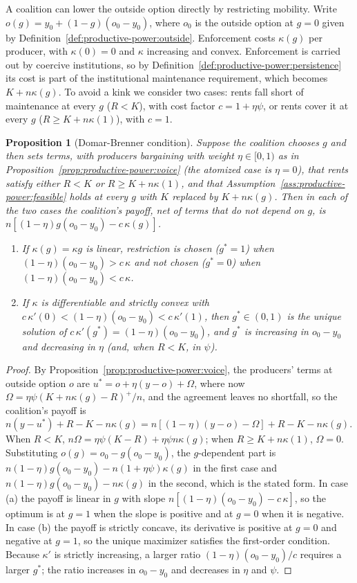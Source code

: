 \documentclass[11pt,letterpaper]{article}
\newtheorem{proposition}[theorem]{Proposition}
\theoremstyle{definition}
\theoremstyle{remark}
\begin{document}
A coalition can lower the outside option directly by restricting mobility. Write $o(g)=y_0+(1-g)(o_0-y_0)$, where $o_0$ is the outside option at $g=0$ given by Definition~\ref{def:productive-power:outside}. Enforcement costs $\kappa(g)$ per producer, with $\kappa(0)=0$ and $\kappa$ increasing and convex. Enforcement is carried out by coercive institutions, so by Definition~\ref{def:productive-power:persistence} its cost is part of the institutional maintenance requirement, which becomes $K+n\kappa(g)$. To avoid a kink we consider two cases: rents fall short of maintenance at every $g$ ($R<K$), with cost factor $c=1+\eta\psi$, or rents cover it at every $g$ ($R\ge K+n\kappa(1)$), with $c=1$.

\begin{proposition}[Domar-Brenner condition]
\label{prop:productive-power:domar}
Suppose the coalition chooses $g$ and then sets terms, with producers bargaining with weight $\eta\in[0,1)$ as in Proposition~\ref{prop:productive-power:voice} (the atomized case is $\eta=0$), that rents satisfy either $R<K$ or $R\ge K+n\kappa(1)$, and that Assumption~\ref{ass:productive-power:feasible} holds at every $g$ with $K$ replaced by $K+n\kappa(g)$. Then in each of the two cases the coalition's payoff, net of terms that do not depend on $g$, is $n[(1-\eta)g(o_0-y_0)-c\,\kappa(g)]$.
\begin{enumerate}
\item[(a)] If $\kappa(g)=\kappa g$ is linear, restriction is chosen ($g^*=1$) when $(1-\eta)(o_0-y_0)>c\,\kappa$ and not chosen ($g^*=0$) when $(1-\eta)(o_0-y_0)<c\,\kappa$.
\item[(b)] If $\kappa$ is differentiable and strictly convex with $c\,\kappa'(0)<(1-\eta)(o_0-y_0)<c\,\kappa'(1)$, then $g^*\in(0,1)$ is the unique solution of $c\,\kappa'(g^*)=(1-\eta)(o_0-y_0)$, and $g^*$ is increasing in $o_0-y_0$ and decreasing in $\eta$ (and, when $R<K$, in $\psi$).
\end{enumerate}
\end{proposition}

\begin{proof}
By Proposition~\ref{prop:productive-power:voice}, the producers' terms at outside option $o$ are $u^*=o+\eta(y-o)+\Omega$, where now $\Omega=\eta\psi(K+n\kappa(g)-R)^+/n$, and the agreement leaves no shortfall, so the coalition's payoff is $n(y-u^*)+R-K-n\kappa(g)=n[(1-\eta)(y-o)-\Omega]+R-K-n\kappa(g)$. When $R<K$, $n\Omega=\eta\psi(K-R)+\eta\psi n\kappa(g)$; when $R\ge K+n\kappa(1)$, $\Omega=0$. Substituting $o(g)=o_0-g(o_0-y_0)$, the $g$-dependent part is $n(1-\eta)g(o_0-y_0)-n(1+\eta\psi)\kappa(g)$ in the first case and $n(1-\eta)g(o_0-y_0)-n\kappa(g)$ in the second, which is the stated form. In case (a) the payoff is linear in $g$ with slope $n[(1-\eta)(o_0-y_0)-c\,\kappa]$, so the optimum is at $g=1$ when the slope is positive and at $g=0$ when it is negative. In case (b) the payoff is strictly concave, its derivative is positive at $g=0$ and negative at $g=1$, so the unique maximizer satisfies the first-order condition. Because $\kappa'$ is strictly increasing, a larger ratio $(1-\eta)(o_0-y_0)/c$ requires a larger $g^*$; the ratio increases in $o_0-y_0$ and decreases in $\eta$ and $\psi$.
\end{proof}
\end{document}
